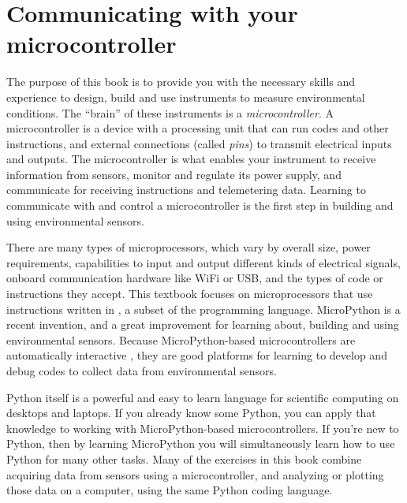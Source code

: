 \setchapterpreamble[u]{\margintoc}
\chapter{Communicating with your microcontroller}

The purpose of this book is to provide you with the necessary skills and experience to design, build and use instruments to measure environmental conditions. 
The ``brain'' of these instruments is a \emph{microcontroller}.
A microcontroller is a device with a processing unit that can run codes and other instructions, and external connections (called \emph{pins}) to transmit electrical inputs and outputs. 
The microcontroller is what enables your instrument to receive information from sensors, monitor and regulate its power supply, and communicate for receiving instructions and telemetering data. 
Learning to communicate with and control a microcontroller is the first step in building and using environmental sensors. 

There are many types of microprocessors, which vary by overall size, power requirements, capabilities to input and output different kinds of electrical signals, onboard communication hardware like WiFi or USB, and the types of code or instructions they accept. 
%
This textbook focuses on microprocessors that use instructions written in , a subset of the  programming language.
MicroPython is a recent invention, and a great improvement for learning about, building and using environmental sensors.
Because MicroPython-based microcontrollers are automatically interactive
, they are good platforms for learning to develop and debug codes to collect data from environmental sensors.  

Python itself is a powerful and easy to learn language for scientific computing on desktops and laptops. 
If you already know some Python, you can apply that knowledge to working with MicroPython-based microcontrollers. 
If you're new to Python, then by learning MicroPython you will simultaneously learn how to use Python for many other tasks. 
Many of the exercises in this book combine acquiring data from sensors using a microcontroller, and analyzing or plotting those data on a computer, using the same Python coding language.


